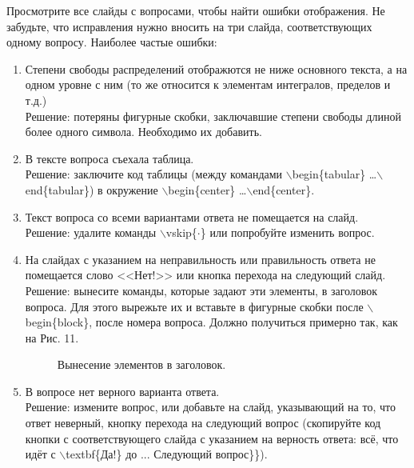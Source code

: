 \documentclass[11pt, a4paper]{extarticle}
\newcommand{\code}[1]{{\color{blue} #1}}
\begin{document}
Просмотрите все слайды с вопросами, чтобы найти ошибки отображения. Не забудьте, что исправления нужно вносить на три слайда, соответствующих одному вопросу. Наиболее частые ошибки:
	\begin{enumerate}
			\item Степени свободы распределений отображются не ниже основного текста, а на одном уровне с ним (то же относится к элементам интегралов, пределов и т.д.) \\
			Решение: потеряны фигурные скобки, заключавшие степени свободы длиной более одного символа. Необходимо их добавить.
			\item В тексте вопроса съехала таблица. \\
			Решение: заключите код таблицы (между командами \code{$\backslash$begin\{tabular\} \ldots $\backslash$end\{tabular\}}) в окружение \code{$\backslash$begin\{center\} \ldots $\backslash$end\{center\}}.
			\item Текст вопроса со всеми вариантами ответа не помещается на слайд. \\
			Решение: удалите команды \code{$\backslash$vskip\{$\cdot$\}} или попробуйте изменить вопрос.
			\item На слайдах с указанием на неправильность или правильность ответа не помещается слово <<Нет!>> или кнопка перехода на следующий слайд. \\
			Решение: вынесите команды, которые задают эти элементы, в заголовок вопроса. Для этого вырежьте их и вставьте в фигурные скобки после \code{$\backslash$begin\{block\}}, после номера вопроса. Должно получиться примерно так, как на Рис. 11.
			\begin{figure}[h!]
				\centering
				\caption{Вынесение элементов в заголовок.}
			\end{figure}
			\item В вопросе нет верного варианта ответа. \\
			Решение: измените вопрос, или добавьте на слайд, указывающий на то, что ответ неверный, кнопку перехода на следующий вопрос (скопируйте код кнопки с соответствующего слайда с указанием на верность ответа: всё, что идёт с \code{$\backslash$textbf\{Да!\}} до \code{... Следующий вопрос\}\}}).
	\end{enumerate}
\end{document}
